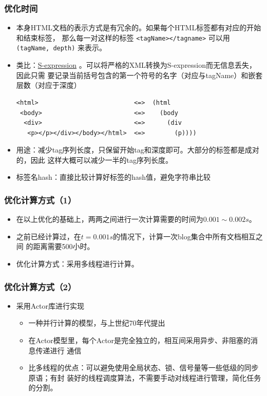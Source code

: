 \documentclass[11pt,presentation]{beamer}
\begin{document}
\begin{frame}[fragile]
\frametitle{优化时间}
\label{sec-2-9}

\begin{itemize}
\item 本身HTML文档的表示方式是有冗余的。如果每个HTML标签都有对应的开始和结束标签，
     那么每一对这样的标签 \texttt{<tagName></tagname>} 可以用 \texttt{(tagName, depth)} 来表示。
\item 类比：\href{http://en.wikipedia.org/wiki/S-expression}{S-expression} 。可以将严格的XML转换为S-expression而无信息丢失，因此只需
     要记录当前括号包含的第一个符号的名字（对应与tagName）和嵌套层数（对应于深度）
     \tiny

\lstset{extendedchars=false,basicstyle=\ttfamily\footnotesize,escapechar=`,breaklines,language=Lisp}
\begin{lstlisting}
<html>                          <=>  (html           
 <body>                         <=>    (body         
  <div>                         <=>      (div        
   <p></p></div></body></html>  <=>        (p))))
\end{lstlisting}
     \normalsize
\item 用途：减少tag序列长度，只保留开始tag和深度即可。大部分的标签都是成对的，因此
     这样大概可以减少一半的tag序列长度。
\item 标签名hash：直接比较计算好标签的hash值，避免字符串比较
\end{itemize}
\end{frame}
\begin{frame}
\frametitle{优化计算方式（1）}
\label{sec-2-10}

\begin{itemize}
\item 在以上优化的基础上，两两之间进行一次计算需要的时间为\(0.001\sim 0.002s\)。
\item 之前已经计算过，在\(t=0.001s\)的情况下，计算一次blog集合中所有文档相互之间
     的距离需要500小时。
\item 优化计算方式：采用多线程进行计算。
\end{itemize}
\end{frame}
\begin{frame}
\frametitle{优化计算方式（2）}
\label{sec-2-11}
\begin{itemize}

\item 采用Actor库进行实现
\label{sec-2-11-1}%
\begin{itemize}
\item 一种并行计算的模型，与上世纪70年代提出
\item 在Actor模型里，每个Actor是完全独立的，相互间采用异步、非阻塞的消息传递进行
      通信
\item 比多线程的优点：可以避免使用全局状态、锁、信号量等一些低级的同步原语；有封
      装好的线程调度算法，不需要手动对线程进行管理，简化任务的分割。
\end{itemize}


\end{itemize} %
\end{frame}
\end{document}
